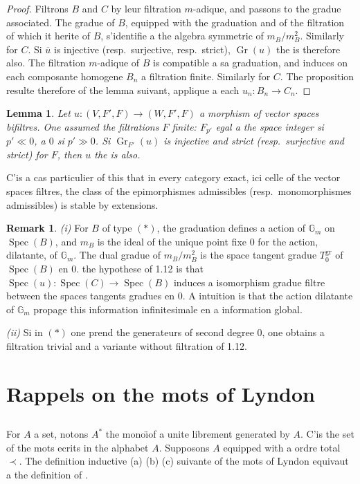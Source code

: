 \documentclass[11pt,a4paper]{article}
\theoremstyle{plain}
\newtheorem{lemma}[theorem]{Lemma}
\theoremstyle{definition}
\newtheorem{remark}[theorem]{Remark}
\DeclareMathOperator{\Spec}{Spec}
\newcommand{\Gm}{\mathbb{G}_m}
\newcommand{\Gr}{\operatorname{Gr}}
\begin{document}
\begin{proof}
Filtrons $B$ and $C$ by leur filtration $m$-adique, and passons to the gradue associated. The gradue of $B$, equipped with the graduation and of the filtration of which it herite of $B$, s'identifie a the algebra symmetric of $m_B/m_B^2$. Similarly for $C$. Si $\overline{u}$ is injective (resp.~surjective, resp.~strict), $\Gr(u)$ the is therefore also. The filtration $m$-adique of $B$ is compatible a sa graduation, and induces on each composante homogene $B_n$ a filtration finite. Similarly for $C$. The proposition resulte therefore of the lemma suivant, applique a each $u_n: B_n \to C_n$.
\end{proof}

\begin{lemma}
\label{lem:1.13}
Let $u: (V,F',F) \to (W,F',F)$ a morphism of vector spaces bifiltres. One assumed the filtrations $F$ finite: $F_{p'}$ egal a the space integer si $p' \ll 0$, a $0$ si $p' \gg 0$. Si $\Gr_{F'}(u)$ is injective and strict (resp.~surjective and strict) for $F$, then $u$ the is also.
\end{lemma}

C'is a cas particulier of this that in every category exact, ici celle of the vector spaces filtres, the class of the epimorphismes admissibles (resp.~monomorphismes admissibles) is stable by extensions.

\begin{remark}
\label{rmk:1.14}
\emph{(i)} For $B$ of type $(\ast)$, the graduation defines a action of $\Gm$ on $\Spec(B)$, and $m_B$ is the ideal of the unique point fixe $0$ for the action, dilatante, of $\Gm$. The dual gradue of $m_B/m_B^2$ is the space tangent gradue $T^{\mathrm{gr}}_0$ of $\Spec(B)$ en $0$. the hypothese of 1.12 is that $\Spec(u): \Spec(C) \to \Spec(B)$ induces a isomorphism gradue filtre between the spaces tangents gradues en $0$. A intuition is that the action dilatante of $\Gm$ propage this information infinitesimale en a information global.

\emph{(ii)} Si in $(\ast)$ one prend the generateurs of second degree $0$, one obtains a filtration trivial and a variante without filtration of 1.12.
\end{remark}

\section{Rappels on the mots of Lyndon}
\label{sec:2}

\subsection{}
For $A$ a set, notons $A^{\ast}$ the mono\"{\i}of a unite librement generated by $A$. C'is the set of the mots ecrits in the alphabet $A$. Supposons $A$ equipped with a ordre total $\prec$. The definition inductive (a) (b) (c) suivante of the mots of Lyndon equivaut a the definition of \cite{3}.
\end{document}

